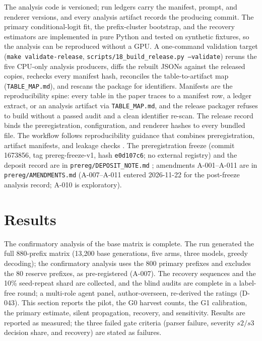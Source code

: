 \documentclass[a4paper,fleqn]{cas-sc}
\begin{document}
The analysis code is versioned; run ledgers carry the manifest, prompt, and renderer
versions, and every analysis artifact records the producing commit. The primary conditional-logit fit, the prefix-cluster bootstrap, and the
recovery estimators are implemented in pure Python and tested on synthetic fixtures, so the
analysis can be reproduced without a GPU. A one-command validation target
(\texttt{make validate-release}, \texttt{scripts/18\_build\_release.py --validate}) reruns the five
CPU-only analysis producers, diffs the rebuilt JSONs against the released copies, rechecks every
manifest hash, reconciles the table-to-artifact map (\texttt{TABLE\_MAP.md}), and rescans the
package for identifiers. Manifests are the reproducibility spine: every table
in the paper traces to a manifest row, a ledger extract, or an analysis artifact via
\texttt{TABLE\_MAP.md}, and the release packager
refuses to build without a passed audit and a clean identifier re-scan. The release record binds
the preregistration, configuration, and renderer hashes to every bundled file. The workflow follows reproducibility
guidance that combines preregistration, artifact manifests, and leakage checks
\cite{nosek2018,munafo2017,pineau,kapoor2023}. The preregistration freeze (commit 1673856,
tag prereg-freeze-v1, hash \texttt{e0d107c6}; no external registry) and the deposit record are in
\texttt{prereg/DEPOSIT\_NOTE.md} \cite{toolresult800prereg}; amendments A-001--A-011 are
in \texttt{prereg/AMENDMENTS.md} (A-007--A-011 entered 2026-11-22 for the post-freeze analysis
record; A-010 is exploratory).

\section{Results}\label{sec:results}

The confirmatory analysis of the base matrix is complete. The run generated the full 880-prefix
matrix (13,200 base generations, five arms, three models, greedy decoding); the confirmatory
analysis uses the 800 primary prefixes and excludes the 80 reserve prefixes, as pre-registered
(A-007).
The recovery sequences and the 10\% seed-repeat shard are collected, and the blind audits are
complete in a label-free round; a multi-role agent panel, author-overseen, re-derived the ratings (D-043). This
section reports the pilot, the G0 harvest counts, the G1 calibration, the
primary estimate, silent propagation, recovery, and sensitivity. Results are reported as
measured; the three failed gate criteria (parser failure, severity $s2/s3$ decision share, and
recovery) are stated as failures.
\end{document}
